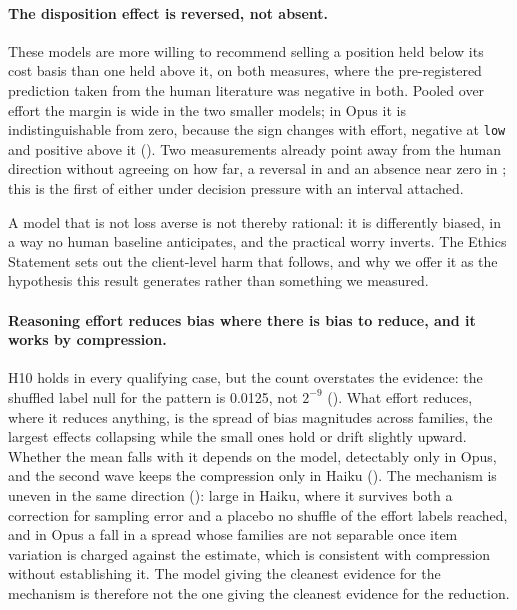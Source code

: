 \paragraph{The disposition effect is reversed, not absent.} These models are
more willing to recommend selling a position held below its cost basis than
one held above it, on both measures, where the pre-registered prediction
taken from the human literature was negative in both. Pooled over effort the
margin is wide in the two smaller models; in Opus it is indistinguishable
from zero, because the sign changes with effort, negative at \texttt{low} and
positive above it (). Two measurements already point away from the
human direction without agreeing on how far, a reversal in
\citet{malberg2025comprehensive} and an absence near zero in
\citet{yee2026calibrating}; this is the first of either under decision
pressure with an interval attached.

A model that is not loss averse is not thereby rational: it is differently
biased, in a way no human baseline anticipates, and the practical worry
inverts. The Ethics Statement sets out the client-level harm that follows,
and why we offer it as the hypothesis this result generates rather than
something we measured.

\paragraph{Reasoning effort reduces bias where there is bias to reduce, and
it works by compression.} H10 holds in every qualifying case, but the
count overstates the evidence: the shuffled label null for the pattern is
0.0125, not $2^{-9}$ (). What effort
reduces, where it reduces anything, is the spread of bias magnitudes across
families, the largest effects collapsing while the small ones hold or drift
slightly upward. Whether the mean falls with it depends on the model,
detectably only in Opus, and the second wave keeps the compression only in
Haiku (). The
mechanism is uneven in the same direction (): large in
Haiku, where it survives both a correction for sampling error and a placebo
no shuffle of the effort labels reached, and in Opus a fall in a spread whose
families are not separable once item variation is charged against the
estimate, which is consistent with compression without establishing it. The model giving the cleanest evidence for the mechanism is
therefore not the one giving the cleanest evidence for the reduction.

